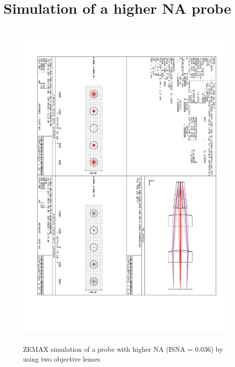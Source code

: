 \section{Simulation of a higher NA probe}
\begin{figure}[h!]\centering \includegraphics[height=17cm,angle=90,origin=c]{appendix/ZEMAXhigh.pdf}
      \caption{ZEMAX simulation of a probe with higher NA (ISNA = 0.036) by using two objective lenses.}
\end{figure}
